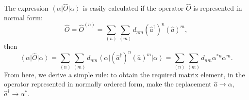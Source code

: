 The expression $\left<\alpha\right|\hat{O}\left|\alpha\right>$ is easily calculated if the operator $\hat{O}$ is represented in normal form:
\begin{equation}
\hat{O} = \hat{O}^{(n)} = \sum_{(n)}\sum_{(m)} d_{nm}
\left(\hat{a}^{\dag}\right)^n
\left(\hat{a}\right)^m,
\label{eqCh1_normalO}
\end{equation}
then
\begin{equation}
\left<\alpha\right|\hat{O}\left|\alpha\right> = 
\sum_{(n)}\sum_{(m)} d_{nm}
\left<\alpha\right|
\left(\hat{a}^{\dag}\right)^n
\left(\hat{a}\right)^m
\left|\alpha\right> = 
\sum_{(n)}\sum_{(m)} d_{nm}
\alpha^{*n}\alpha^{m}.
\end{equation}
From here, we derive a simple rule: to obtain the required matrix element, in the operator represented in normally ordered form, make the replacement $\hat{a}\rightarrow\alpha$, 
$\hat{a}^{\dag}\rightarrow\alpha^{*}$.

